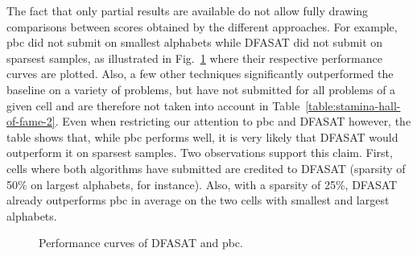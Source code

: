 The fact that only partial results are available do not allow fully drawing comparisons between scores obtained by the different approaches. For example, pbc did not submit on smallest alphabets while DFASAT did not submit on sparsest samples, as illustrated in Fig.~\ref{image:stamina-winners-performance-comparison} where their respective performance curves are plotted. Also, a few other techniques significantly outperformed the baseline on a variety of problems, but have not submitted for all problems of a given cell and are therefore not taken into account in Table~\ref{table:stamina-hall-of-fame-2}. Even when restricting our attention to pbc and DFASAT however, the table shows that, while pbc performs well, it is very likely that DFASAT would outperform it on sparsest samples. Two observations support this claim. First, cells where both algorithms have submitted are credited to DFASAT (sparsity of 50\% on largest alphabets, for instance). Also, with a sparsity of 25\%, DFASAT already outperforms pbc in average on the two cells with smallest and largest alphabets. 

\begin{figure}[ht]
\centering{}
  \caption{Performance curves of DFASAT and pbc\label{image:stamina-winners-performance-comparison}.}
\end{figure}

